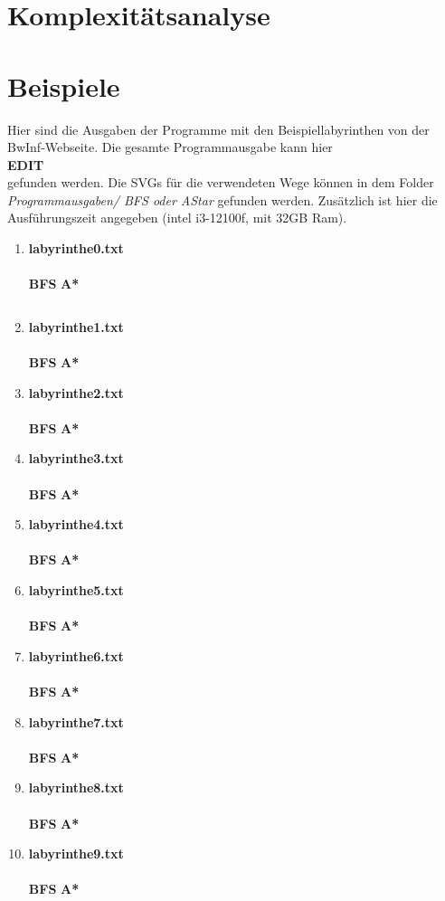 \documentclass[a4paper,10pt,ngerman]{scrartcl}
\begin{document}
\section{Komplexitätsanalyse}
\section{Beispiele}
Hier sind die Ausgaben der Programme mit den Beispiellabyrinthen von der BwInf-Webseite. Die gesamte Programmausgabe kann hier \\
\textbf{EDIT}\\
gefunden werden. Die SVGs für die verwendeten Wege können in dem Folder \textit{Programmausgaben/ BFS oder AStar} gefunden werden. Zusätzlich ist hier die Ausführungszeit angegeben (intel i3-12100f, mit 32GB Ram).

\begin{enumerate}
  \item \textbf{labyrinthe0.txt}\\
\\\textbf{BFS}
\textbf{A*}
  \begin{verbatim}

  \end{verbatim}
  \item \textbf{labyrinthe1.txt}\\
\\\textbf{BFS}
\textbf{A*}
  \item \textbf{labyrinthe2.txt}\\
\\\textbf{BFS}
\textbf{A*}
  \item \textbf{labyrinthe3.txt}\\
\\\textbf{BFS}
\textbf{A*}
  \item \textbf{labyrinthe4.txt}\\
\\\textbf{BFS}
\textbf{A*}
  \item \textbf{labyrinthe5.txt}\\
\\\textbf{BFS}
\textbf{A*}
  \item \textbf{labyrinthe6.txt}\\
\\\textbf{BFS}
\textbf{A*}
  \item \textbf{labyrinthe7.txt}\\
\\\textbf{BFS}
\textbf{A*}
  \item \textbf{labyrinthe8.txt}\\
\\\textbf{BFS}
\textbf{A*}
  \item \textbf{labyrinthe9.txt}\\
\\\textbf{BFS}
\textbf{A*}
\end{enumerate}
\end{document}
